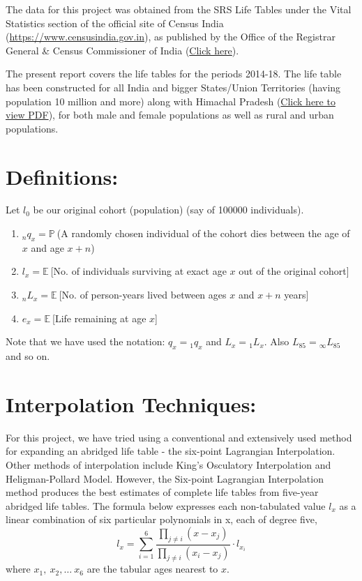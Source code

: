 \documentclass[
  14pt,
]{article}
\begin{document}
The data for this project was obtained from the SRS Life Tables under
the Vital Statistics section of the official site of Census India
(\href{https://www.censusindia.gov.in}{https://www.censusindia.gov.in}),
as published by the Office of the Registrar General \& Census
Commissioner of India
(\href{ https://www.censusindia.gov.in/vital_statistics/Appendix\_SRS\_Based\_Life\_Table.html}{Click here}).

The present report covers the life tables for the periods 2014-18. The
life table has been constructed for all India and bigger States/Union
Territories (having population 10 million and more) along with Himachal
Pradesh
(\href{ https://censusindia.gov.in/Vital_Statistics/SRS_Life_Table/SRS\%20based\%20Abridged\%20Life\%20Tables\%202014-18.pdf}{Click here to view PDF}),
for both male and female populations as well as rural and urban
populations.

\section*{Definitions:}

Let \(l_0\) be our original cohort (population) (say of 100000
individuals).

\begin{enumerate}
    \item ${}_nq_x=\mathbb{P}~$(A randomly chosen individual of the cohort dies between the age  of $x$ and age $x+n$)
    \item $l_x=\mathbb{E}~$[No. of individuals surviving at exact age $x$ out of the original cohort]
    \item ${}_nL_x=\mathbb{E}~$[No. of person-years lived between ages $x$ and $x+n$ years]
    \item $e_x=\mathbb{E}~$[Life remaining at age $x$]
\end{enumerate}

Note that we have used the notation: \(q_x={}_1q_x\) and
\(L_x={}_1L_x\). Also \(L_{85}={}_{\infty}L_{85}\) and so on.

\section*{Interpolation Techniques:}

For this project, we have tried using a conventional and extensively
used method for expanding an abridged life table - the six-point
Lagrangian Interpolation. Other methods of interpolation include King's
Osculatory Interpolation and Heligman-Pollard Model. However, the
Six-point Lagrangian Interpolation method produces the best estimates of
complete life tables from five-year abridged life
tables\cite{comparison}. The formula below expresses each non-tabulated
value \(l_x\) as a linear combination of six particular polynomials in
x, each of degree five,
\begin{equation}l_x=\displaystyle\sum_{i=1}^6 \dfrac{\prod_{j\neq i} (x-x_j)}{\prod_{j\neq i} (x_i-x_j)}\cdot l_{x_i}\end{equation}
where \(x_1, ~x_2,\dots~ x_6\) are the tabular ages nearest to \(x\).
\end{document}
